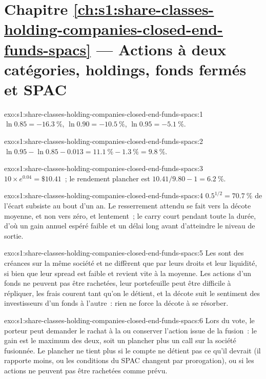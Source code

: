 \section*{Chapitre \ref{ch:s1:share-classes-holding-companies-closed-end-funds-spacs} --- Actions à deux catégories, holdings, fonds fermés et SPAC}

\begin{solution}{exo:s1:share-classes-holding-companies-closed-end-funds-spacs:1}
$\ln 0.85 = -16.3~\%$, $\ln 0.90 = -10.5~\%$, $\ln 0.95 = -5.1~\%$.
\end{solution}

\begin{solution}{exo:s1:share-classes-holding-companies-closed-end-funds-spacs:2}
$\ln 0.95 - \ln 0.85 - 0.013 = 11.1~\% - 1.3~\% = 9.8~\%$.
\end{solution}

\begin{solution}{exo:s1:share-classes-holding-companies-closed-end-funds-spacs:3}
$10 \times e^{0.04} = \$10.41$~; le rendement plancher est $10.41/9.80 - 1 = 6.2~\%$.
\end{solution}

\begin{solution}{exo:s1:share-classes-holding-companies-closed-end-funds-spacs:4}
$0.5^{1/2} = 70.7~\%$ de l'écart subsiste au bout d'un an. Le resserrement attendu se fait vers la décote moyenne, et non vers zéro, et lentement~; le carry court pendant toute la durée,
d'où un gain annuel espéré faible et un délai long avant d'atteindre le niveau de sortie.
\end{solution}

\begin{solution}{exo:s1:share-classes-holding-companies-closed-end-funds-spacs:5}
Les  sont des créances sur la même société et ne diffèrent que par leurs droits et leur liquidité, si bien que leur spread est faible et revient vite à la moyenne. Les actions d'un fonds ne peuvent pas être
rachetées, leur portefeuille peut être difficile à répliquer, les frais courent tant qu'on le détient, et la décote suit le sentiment des investisseurs d'un fonds à l'autre~: rien
ne force la décote à se résorber.
\end{solution}

\begin{solution}{exo:s1:share-classes-holding-companies-closed-end-funds-spacs:6}
Lors du vote, le porteur peut demander le rachat à la  ou conserver l'action issue de la fusion~: le gain est le maximum des deux, soit un plancher plus un call sur la
société fusionnée. Le plancher ne tient plus si le compte ne détient pas ce qu'il devrait (il rapporte moins, ou les conditions du SPAC changent par prorogation), ou si les actions ne peuvent pas
être rachetées comme prévu.
\end{solution}

